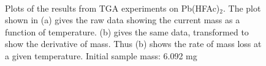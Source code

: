 \begin{figure}[htbp]
   \centering
    \\
   \caption[TGA Results for Pb(HFAc)$_{2}$ Precursor]%
   		{Plots of the results from TGA experiments on Pb(HFAc)$_{2}$. The plot shown in (a) gives the raw %
		data showing the current mass as a function of temperature. (b) gives the same data, transformed %
		to show the derivative of mass. Thus (b) shows the rate of mass loss at a given temperature. Initial %
		sample mass: 6.092 mg}
   \label{fig:TGA-HFAc}
\end{figure}

